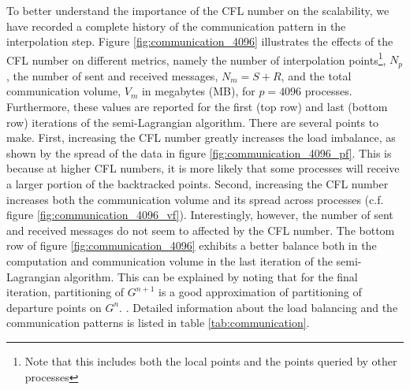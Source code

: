 To better understand the importance of the CFL number on the scalability, we have recorded a complete history of the communication pattern in the interpolation step. Figure \ref{fig:communication_4096} illustrates the effects of the CFL number on different metrics, namely the number of interpolation points\footnote{Note that this includes both the local points and the points queried by other processes}, $N_p$, the number of sent and received messages, $N_m = S + R$, and the total communication volume, $V_m$ in megabytes (MB), for $p=4096$ processes. Furthermore, these values are reported for the first (top row) and last (bottom row) iterations of the semi-Lagrangian algorithm. There are several points to make. First, increasing the CFL number greatly increases the load imbalance, as shown by the spread of the data in figure \ref{fig:communication_4096_pf}. This is because at higher CFL numbers, it is more likely that some processes will receive a larger portion of the backtracked points. Second, increasing the CFL number increases both the communication volume and its spread across processes (c.f. figure \ref{fig:communication_4096_vf}). Interestingly, however, the number of sent and received messages do not seem to affected by the CFL number. The bottom row of figure \ref{fig:communication_4096} exhibits a better balance both in the computation and communication volume in the last iteration of the semi-Lagrangian algorithm. This can be explained by noting that for the final iteration, partitioning of $G^{n+1}$ is a good approximation of partitioning of departure points on $G^n$.   . Detailed information about the load balancing and the communication patterns is listed in table \ref{tab:communication}.
